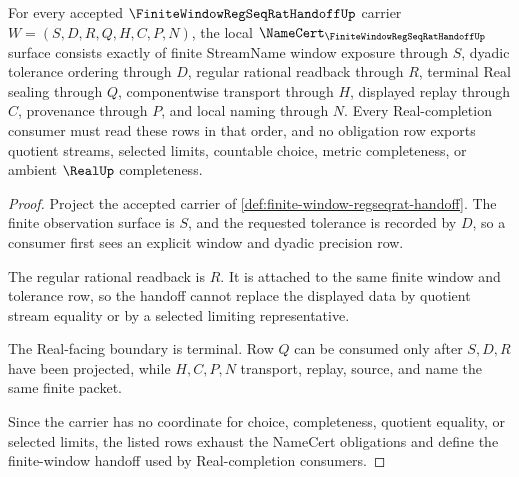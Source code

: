 
\begin{theorem}
\label{thm:finite-window-regseqrat-handoff-namecert-obligations}
For every accepted $\FiniteWindowRegSeqRatHandoffUp$ carrier $W=(S,D,R,Q,H,C,P,N)$, the local $\NameCert_{\FiniteWindowRegSeqRatHandoffUp}$ surface consists exactly of finite StreamName window exposure through $S$, dyadic tolerance ordering through $D$, regular rational readback through $R$, terminal Real sealing through $Q$, componentwise transport through $H$, displayed replay through $C$, provenance through $P$, and local naming through $N$. Every Real-completion consumer must read these rows in that order, and no obligation row exports quotient streams, selected limits, countable choice, metric completeness, or ambient $\RealUp$ completeness.
\end{theorem}
\begin{proof}
Project the accepted carrier of \autoref{def:finite-window-regseqrat-handoff}. The finite observation surface is $S$, and the requested tolerance is recorded by $D$, so a consumer first sees an explicit window and dyadic precision row.

The regular rational readback is $R$. It is attached to the same finite window and tolerance row, so the handoff cannot replace the displayed data by quotient stream equality or by a selected limiting representative.

The Real-facing boundary is terminal. Row $Q$ can be consumed only after $S,D,R$ have been projected, while $H,C,P,N$ transport, replay, source, and name the same finite packet.

Since the carrier has no coordinate for choice, completeness, quotient equality, or selected limits, the listed rows exhaust the NameCert obligations and define the finite-window handoff used by Real-completion consumers.
\end{proof}



